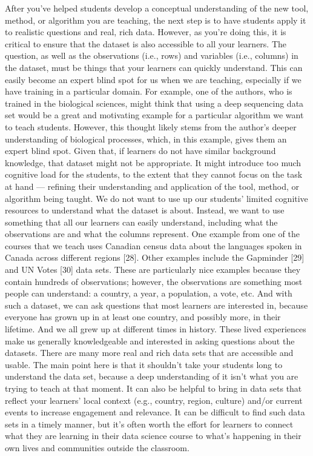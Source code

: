 \documentclass[
  10pt,
  letterpaper,
]{article}
\begin{document}
After you've helped students develop a conceptual understanding of the
new tool, method, or algorithm you are teaching, the next step is to
have students apply it to realistic questions and real, rich data.
However, as you're doing this, it is critical to ensure that the dataset
is also accessible to all your learners. The question, as well as the
observations (i.e., rows) and variables (i.e., columns) in the dataset,
must be things that your learners can quickly understand. This can
easily become an expert blind spot for us when we are teaching,
especially if we have training in a particular domain. For example, one
of the authors, who is trained in the biological sciences, might think
that using a deep sequencing data set would be a great and motivating
example for a particular algorithm we want to teach students. However,
this thought likely stems from the author's deeper understanding of
biological processes, which, in this example, gives them an expert blind
spot. Given that, if learners do not have similar background knowledge,
that dataset might not be appropriate. It might introduce too much
cognitive load for the students, to the extent that they cannot focus on
the task at hand --- refining their understanding and application of the
tool, method, or algorithm being taught. We do not want to use up our
students' limited cognitive resources to understand what the dataset is
about. Instead, we want to use something that all our learners can
easily understand, including what the observations are and what the
columns represent. One example from one of the courses that we teach
uses Canadian census data about the languages spoken in Canada across
different regions {[}28{]}. Other examples include the Gapminder
{[}29{]} and UN Votes {[}30{]} data sets. These are particularly nice
examples because they contain hundreds of observations; however, the
observations are something most people can understand: a country, a
year, a population, a vote, etc. And with such a dataset, we can ask
questions that most learners are interested in, because everyone has
grown up in at least one country, and possibly more, in their lifetime.
And we all grew up at different times in history. These lived
experiences make us generally knowledgeable and interested in asking
questions about the datasets. There are many more real and rich data
sets that are accessible and usable. The main point here is that it
shouldn't take your students long to understand the data set, because a
deep understanding of it isn't what you are trying to teach at that
moment. It can also be helpful to bring in data sets that reflect your
learners' local context (e.g., country, region, culture) and/or current
events to increase engagement and relevance. It can be difficult to find
such data sets in a timely manner, but it's often worth the effort for
learners to connect what they are learning in their data science course
to what's happening in their own lives and communities outside the
classroom.
\end{document}
